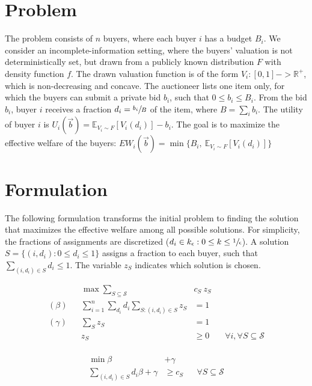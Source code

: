 \section{Problem}

The problem consists of $n$ buyers, where each buyer $i$ has a budget $B_i$.
We consider an incomplete-information setting, where the buyers' valuation is not deterministically set, but drawn from a publicly known distribution $F$ with density function $f$. The drawn valuation function is of the form $V_i : [0,1] -> \mathbb{R}^+$, which is non-decreasing and concave. The auctioneer lists one item only, for which the buyers can submit a private bid $b_i$, such that $0 \le b_i \le B_i$. From the bid $b_i$, buyer $i$ receives a fraction $d_i = \sfrac{b_i}{B}$ of the item, where $B = \sum_i b_i$. The utility of buyer $i$ is $U_i(\vec{b}) = \mathbb{E}_{V_i \sim F}[V_i(d_i)] - b_i$. The goal is to maximize the effective welfare of the buyers: $EW_i(\vec{b}) = \min\{B_i,\  \mathbb{E}_{V_i \sim F}[V_i(d_i)]\}$

\section{Formulation}

The following formulation transforms the initial problem to finding the solution that maximizes the effective welfare among all possible solutions. For simplicity, the fractions of assignments are discretized ($d_i \in k_{\epsilon} : 0 \le k \le \sfrac{1}{\epsilon}$). A solution $S = \{(i, d_i) : 0 \le d_i \le 1\}$ assigns a fraction to each buyer, such that $\sum_{(i,d_{i}) \in S} d_{i} \le 1$. The variable $z_S$ indicates which solution is chosen.

\begin{minipage}[t]{0.59\textwidth}
	\begin{align*}
		&& \max  \sum_{S \subseteq \mathcal{S}} &c_{S}\ z_{S} \\
		(\beta) && \sum_{i=1}^{n} \sum_{d_{i}} d_{i} \sum_{S: (i,d_{i}) \in S } z_{S} &= 1 & & \\
		(\gamma) && \sum_{S} z_{S}  &= 1	& & \\
		&& z_{S} &\geq 0 & & \forall i, \forall S \subseteq \mathcal{S}\\
	\end{align*}
\end{minipage}
\begin{minipage}[t]{0.3\textwidth}
	\begin{align*}
		\min \beta &+ \gamma \\
		\sum_{(i,d_{i}) \in S} d_{i} \beta + \gamma &\geq c_{S}  & & \forall S \subseteq \mathcal{S}\\
\end{align*}
\end{minipage}


